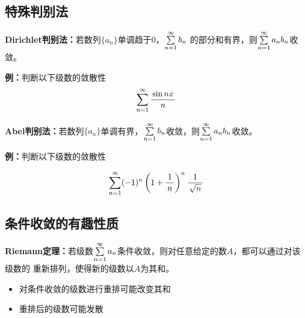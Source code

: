\begin{shaded}

\subsection{特殊判别法}

{\bf Dirichlet判别法：}若数列$\{a_n\}$单调趋于$0$，$\sum\limits_{n=1}^{\infty} b_n$
  的部分和有界，则$\sum\limits_{n=1}^{\infty} a_nb_n$收敛。
  
{\bf 例：}判断以下级数的敛散性
$$\sum\limits_{n=1}^{\infty}\displaystyle\frac{\,{\sin nx}\,}{\,{n}\,}$$

{\bf Abel判别法：}若数列$\{a_n\}$单调有界，$\sum\limits_{n=1}^{\infty} b_n$收敛，则$\sum\limits_{n=1}^{\infty} a_nb_n$收敛。

{\bf 例：}判断以下级数的敛散性

$$\sum\limits_{n=1}^{\infty}(-1)^n\left(1+\displaystyle\frac{\,{1}\,}{\,{n}\,}\right)^n\displaystyle\frac{\,{1}\,}{\,{\sqrt n}\,}$$ 

\subsection{条件收敛的有趣性质}

{\bf Riemann定理：}若级数$\sum\limits_{n=1}^{\infty} a_n$条件收敛，则对任意给定的数$A$，都可以通过对该级数的
重新排列，使得新的级数以$A$为其和。

\begin{itemize}
  \item 对条件收敛的级数进行重排可能改变其和
  \item 重排后的级数可能发散
\end{itemize}

\end{shaded}

\begin{center}
\end{center}

